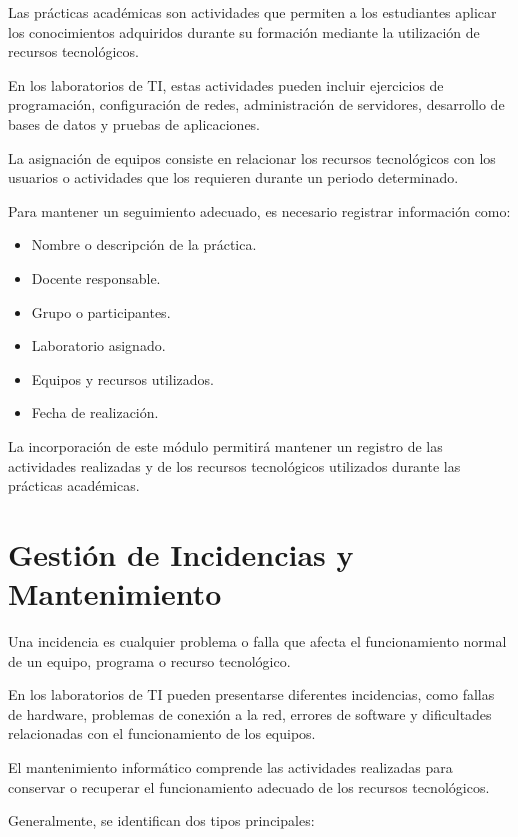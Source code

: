 Las prácticas académicas son actividades que permiten a los estudiantes aplicar los conocimientos adquiridos durante su formación mediante la utilización de recursos tecnológicos.

En los laboratorios de TI, estas actividades pueden incluir ejercicios de programación, configuración de redes, administración de servidores, desarrollo de bases de datos y pruebas de aplicaciones.

La asignación de equipos consiste en relacionar los recursos tecnológicos con los usuarios o actividades que los requieren durante un periodo determinado.

Para mantener un seguimiento adecuado, es necesario registrar información como:

\begin{itemize}

    \item Nombre o descripción de la práctica.
    \item Docente responsable.
    \item Grupo o participantes.
    \item Laboratorio asignado.
    \item Equipos y recursos utilizados.
    \item Fecha de realización.

\end{itemize}

La incorporación de este módulo permitirá mantener un registro de las actividades realizadas y de los recursos tecnológicos utilizados durante las prácticas académicas.

\section{Gestión de Incidencias y Mantenimiento}

Una incidencia es cualquier problema o falla que afecta el funcionamiento normal de un equipo, programa o recurso tecnológico.

En los laboratorios de TI pueden presentarse diferentes incidencias, como fallas de hardware, problemas de conexión a la red, errores de software y dificultades relacionadas con el funcionamiento de los equipos.

El mantenimiento informático comprende las actividades realizadas para conservar o recuperar el funcionamiento adecuado de los recursos tecnológicos.

Generalmente, se identifican dos tipos principales:

